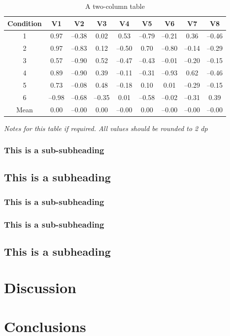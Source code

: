 \documentclass[paper=a4,fontsize=11pt,twocolumn]{article}
\begin{document}
\begin{table}
\begin{centering}
\caption{A two-column table}\label{tab:two-column}%
	\begin{tabular}[\columnwidth]{ccccccccc}\toprule
	Condition & V1 & V2 & V3 & V4 & V5 & V6 & V7 & V8 \\
	\midrule
	1 & 0.97 & --0.38 & 0.02 & 0.53 & --0.79 & --0.21 & 0.36 & --0.46 \\
	2 & 0.97 & --0.83 & 0.12 & --0.50 & 0.70 & --0.80 & --0.14 & --0.29 \\
	3 & 0.57 & --0.90 & 0.52 & --0.47 & --0.43 & --0.01 & --0.20 & --0.15 \\
	4 & 0.89 & --0.90 & 0.39 & --0.11 & --0.31 & --0.93 & 0.62 & --0.46 \\
	5 & 0.73 & --0.08 & 0.48 & --0.18 & 0.10 & 0.01 & --0.29 & --0.15 \\
	6 & --0.98 & --0.68 & --0.35 & 0.01 & --0.58 & --0.02 & --0.31 & 0.39 \\
	\cmidrule{2-9}
	Mean & 0.00 & --0.00 & 0.00 & --0.00 & 0.00 & --0.00 & --0.00 & --0.00 \\
	\bottomrule
	\end{tabular}\par
	\medskip
\textit{Notes for this table if required. All values should be rounded to 2 dp}
\end{centering}
\end{table}

\lipsum[12]
\subsubsection{This is a sub-subheading}
\lipsum[13]

\subsection{This is a subheading}
\subsubsection{This is a sub-subheading}
\lipsum[14]
\subsubsection{This is a sub-subheading}
\lipsum[15]

\subsection{This is a subheading}
\lipsum[16-18]

\section{Discussion}
\lipsum[19-23]

\section{Conclusions}
\lipsum[24-32]


\end{document}
